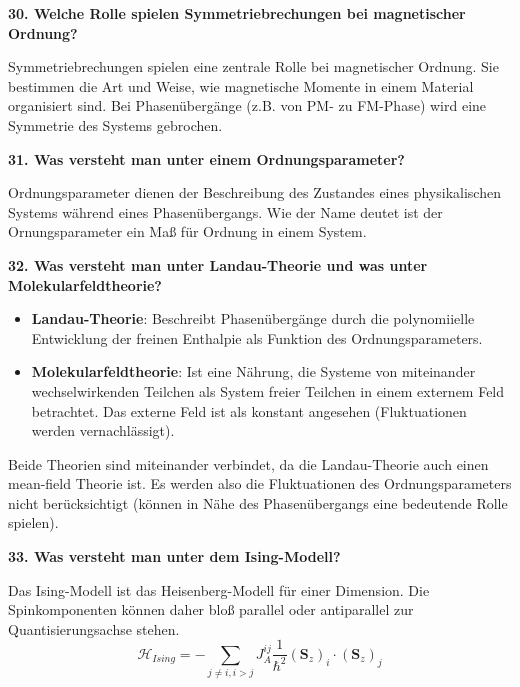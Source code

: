 \noindent\textbf{30. Welche Rolle spielen Symmetriebrechungen bei magnetischer Ordnung?}\\
\begin{addmargin}[25pt]{0pt}
Symmetriebrechungen spielen eine zentrale Rolle bei magnetischer Ordnung. Sie bestimmen die Art und Weise, wie magnetische Momente in einem Material organisiert sind. Bei Phasenübergänge (z.B. von PM- zu FM-Phase) wird eine Symmetrie des Systems gebrochen.\\
\end{addmargin}

\noindent\textbf{31. Was versteht man unter einem Ordnungsparameter?}\\
\begin{addmargin}[25pt]{0pt}
Ordnungsparameter dienen der Beschreibung des Zustandes eines physikalischen Systems während eines Phasenübergangs. Wie der Name deutet ist der Ornungsparameter ein Maß für Ordnung in einem System.\\
\end{addmargin}

\noindent\textbf{32. Was versteht man unter Landau-Theorie und was unter Molekularfeldtheorie?}\\
\begin{itemize}
    \item \textbf{Landau-Theorie}: Beschreibt Phasenübergänge durch die polynomiielle Entwicklung der freinen Enthalpie als Funktion des Ordnungsparameters. 
    \item \textbf{Molekularfeldtheorie}: Ist eine Nährung, die Systeme von miteinander wechselwirkenden Teilchen als System freier Teilchen in einem externem Feld betrachtet. Das externe Feld ist als konstant angesehen (Fluktuationen werden vernachlässigt). 
\end{itemize}
\begin{addmargin}[25pt]{0pt}
    Beide Theorien sind miteinander verbindet, da die Landau-Theorie auch einen \glqq mean-field \grqq Theorie ist. Es werden also die Fluktuationen des Ordnungsparameters nicht berücksichtigt (können in Nähe des Phasenübergangs eine bedeutende Rolle spielen). 
\end{addmargin}

\noindent\textbf{33. Was versteht man unter dem Ising-Modell?}\\
\begin{addmargin}[25pt]{0pt}
Das Ising-Modell ist das Heisenberg-Modell für einer Dimension. Die Spinkomponenten können daher bloß parallel oder antiparallel zur Quantisierungsachse stehen.
\begin{equation}
    \mathcal{H}_{Ising} = -\sum_{j\neq i, i>j} J^{ij}_{A} \frac{1}{\hbar^2} (\boldsymbol{S}_{z})_{i} \cdot (\boldsymbol{S}_{z})_{j}
\end{equation}\\
\end{addmargin}

